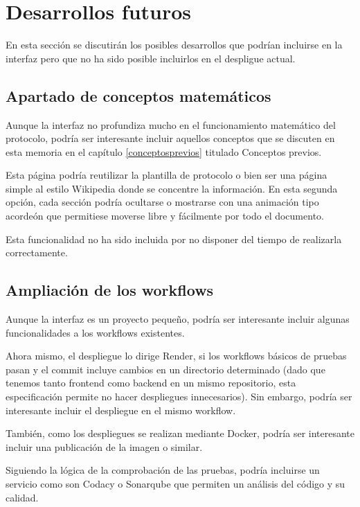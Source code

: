 \section{Desarrollos futuros}

En esta sección se discutirán los posibles desarrollos que podrían incluirse en la interfaz pero que no ha sido posible incluirlos en el despligue actual.

\subsection{Apartado de conceptos matemáticos}

Aunque la interfaz no profundiza mucho en el funcionamiento matemático del protocolo, podría ser interesante incluir aquellos conceptos que se discuten en esta memoria en el capítulo \ref{conceptosprevios} titulado Conceptos previos.

Esta página podría reutilizar la plantilla de protocolo o bien ser una página simple al estilo Wikipedia donde se concentre la información. En esta segunda opción, cada sección podría ocultarse o mostrarse con una animación tipo acordeón que permitiese moverse libre y fácilmente por todo el documento.

Esta funcionalidad no ha sido incluida por no disponer del tiempo de realizarla correctamente.


\subsection{Ampliación de los workflows}

Aunque la interfaz es un proyecto pequeño, podría ser interesante incluir algunas funcionalidades a los workflows existentes.

Ahora mismo, el despliegue lo dirige Render, si los workflows básicos de pruebas pasan y el commit incluye cambios en un directorio determinado (dado que tenemos tanto frontend como backend en un mismo repositorio, esta especificación permite no hacer despliegues innecesarios). Sin embargo, podría ser interesante incluir el despliegue en el mismo workflow.

También, como los despliegues se realizan mediante Docker, podría ser interesante incluir una publicación de la imagen o similar.

Siguiendo la lógica de la comprobación de las pruebas, podría incluirse un servicio como son Codacy o Sonarqube que permiten un análisis del código y su calidad.

